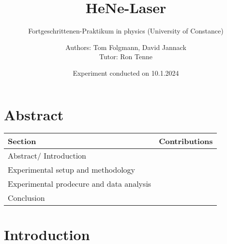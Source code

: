 \documentclass[
    oneside, 
    footinclude=off, 
    captions=tableheading, 
    DIV=12;usenames,
    dvipsnames
]{scrartcl}
\begin{document}
    \title{HeNe-Laser}
    \subtitle{Fortgeschrittenen-Praktikum in physics (University of Constance)}
    \author{Authors: Tom Folgmann, David Jannack \\ \large{Tutor: Ron Tenne}}
    \date{Experiment conducted on 10.1.2024}
    \maketitle
    \thispagestyle{empty}
    
    \section*{Abstract}
        

    \vspace{2cm}
    \begin{table}[H]
        \centering
            \begin{tabular}{l|l}
            Section & Contributions \\\hline\hline
            Abstract/ Introduction & \\
            Experimental setup and methodology & \\
            Experimental prodecure and data analysis & \\
            Conclusion &
        \end{tabular}
    \end{table}

    \newpage


    \tableofcontents
    \thispagestyle{empty}	
    \newpage
    \setcounter{page}{1}


\newpage
\section{Introduction}
    

%    
\end{document}

